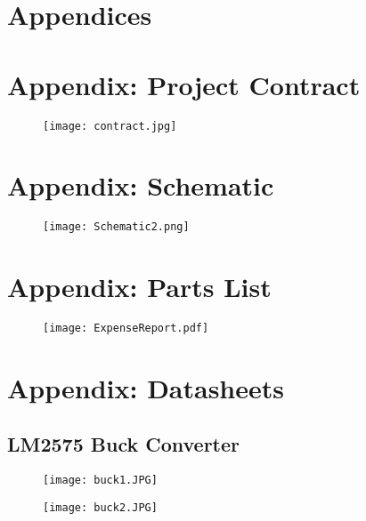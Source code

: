 \documentclass[11pt,letter]{article}
\providecommand{\DIFaddbeginFL}{} %
\providecommand{\DIFaddendFL}{} %
\providecommand{\DIFdelbeginFL}{} %
\providecommand{\DIFdelendFL}{} %
\newcommand{\DIFscaledelfig}{0.5}
\newlength{\DIFdelgraphicswidth} %
\newlength{\DIFdelgraphicsheight} %
\newcommand{\DIFaddincludegraphics}[2][]{{\color{blue}\fbox{\DIFOincludegraphics[#1]{#2}}}} %
\newcommand{\DIFdelincludegraphics}[2][]{%
\sbox{\DIFdelgraphicsbox}{\DIFOincludegraphics[#1]{#2}}%
\settoboxwidth{\DIFdelgraphicswidth}{\DIFdelgraphicsbox} %
\settoboxtotalheight{\DIFdelgraphicsheight}{\DIFdelgraphicsbox} %
\scalebox{\DIFscaledelfig}{%
\parbox[b]{\DIFdelgraphicswidth}{\usebox{\DIFdelgraphicsbox}\\[-\baselineskip] \rule{\DIFdelgraphicswidth}{0em}}\llap{\resizebox{\DIFdelgraphicswidth}{\DIFdelgraphicsheight}{%
\setlength{\unitlength}{\DIFdelgraphicswidth}%
\begin{picture}(1,1)%
\thicklines\linethickness{2pt} %
{\color[rgb]{1,0,0}\put(0,0){\framebox(1,1){}}}%
{\color[rgb]{1,0,0}\put(0,0){\line( 1,1){1}}}%
{\color[rgb]{1,0,0}\put(0,1){\line(1,-1){1}}}%
\end{picture}%
}\hspace*{3pt}}} %
} %
\DeclareRobustCommand{\DIFaddbeginFL}{\DIFOaddbeginFL \let\includegraphics\DIFaddincludegraphics} %
\DeclareRobustCommand{\DIFaddendFL}{\DIFOaddendFL \let\includegraphics\DIFOincludegraphics} %
\DeclareRobustCommand{\DIFdelbeginFL}{\DIFOdelbeginFL \let\includegraphics\DIFdelincludegraphics} %
\DeclareRobustCommand{\DIFdelendFL}{\DIFOaddendFL \let\includegraphics\DIFOincludegraphics} %
\begin{document}
\appendix

\section*{Appendices}

\section{Appendix: Project Contract}

\begin{figure}[H]
    \centering
    \texttt{[image: contract.jpg]}
\end{figure}

\section{Appendix: Schematic}
\begin{figure}[H]
    \centering
    \DIFdelbeginFL %
\DIFdelendFL \DIFaddbeginFL \texttt{[image: Schematic2.png]}
\DIFaddendFL \end{figure}

\section{Appendix: Parts List}

\begin{figure}[H]
    \centering
    \texttt{[image: ExpenseReport.pdf]}
\end{figure}

\newpage

\section{Appendix: Datasheets}

\subsection{LM2575 Buck Converter}

\begin{figure}[H]
    \centering
    \texttt{[image: buck1.JPG]}
\end{figure}

\begin{figure}[H]
    \centering
    \texttt{[image: buck2.JPG]}
\end{figure}
\end{document}
